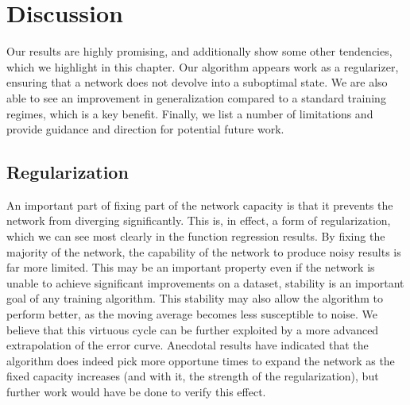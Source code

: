 \chapter{Discussion}
Our results are highly promising, and additionally show some other tendencies, which we highlight in this chapter.
Our algorithm appears work as a regularizer, ensuring that a network does not devolve into a suboptimal state.
We are also able to see an improvement in generalization compared to a standard training regimes, which is a key benefit.
Finally, we list a number of limitations and provide guidance and direction for potential future work.

\section{Regularization}

An important part of fixing part of the network capacity is that it prevents the network from diverging significantly.
This is, in effect, a form of regularization, which we can see most clearly in the function regression results.
By fixing the majority of the network, the capability of the network to produce noisy results is far more limited.
This may be an important property even if the network is unable to achieve significant improvements on a dataset, stability is an important goal of any training algorithm.
This stability may also allow the algorithm to perform better, as the moving average becomes less susceptible to noise.
We believe that this virtuous cycle can be further exploited by a more advanced extrapolation of the error curve.
Anecdotal results have indicated that the algorithm does indeed pick more opportune times to expand the network as the fixed capacity increases (and with it, the strength of the regularization), but further work would have be done to verify this effect.

